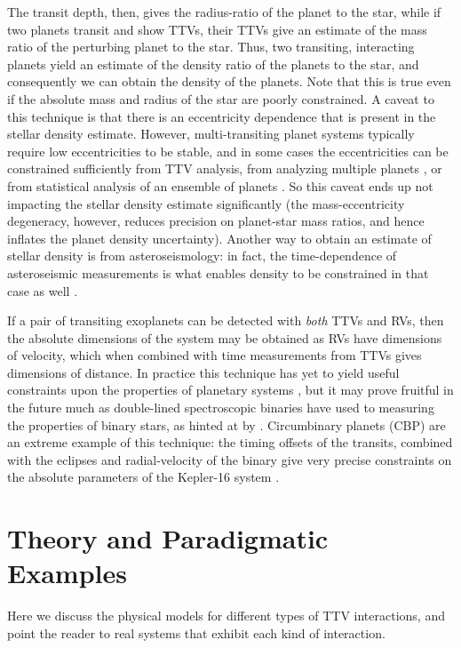 \documentclass[graybox,natbib,nosecnum]{svmult}
\begin{document}
The transit depth, then, gives the radius-ratio of the planet to the star, while if two planets
transit and show TTVs, their TTVs give an estimate of the mass ratio of the perturbing planet
to the star.  Thus, two transiting, interacting planets yield an estimate of the density ratio of
the planets to the star, and consequently we can obtain the density of the planets.
Note that this is true even if the absolute mass and radius of the star are poorly
constrained.  A caveat to this technique is that there is an eccentricity dependence that 
is present in the stellar density estimate.  However, multi-transiting planet systems typically require low eccentricities to be stable,
and in some cases the eccentricities can be constrained sufficiently from TTV analysis, from
analyzing multiple planets \citep{2014MNRAS.440.2164K}, or
from statistical analysis of an ensemble of planets \citep{Hadden2017}.  So this caveat ends up not impacting the stellar density 
estimate significantly (the mass-eccentricity degeneracy, however, reduces precision on planet-star mass ratios, and hence inflates the planet density uncertainty). 
Another way to obtain an estimate of stellar density is from asteroseismology:
in fact, the time-dependence of asteroseismic measurements is what enables density
to be constrained in that case as well \citep{1986ApJ...306L..37U}.

If a pair of transiting exoplanets can be detected with {\it both} TTVs and RVs, then the
absolute dimensions of the system may be obtained \citep{2005MNRAS.359..567A,
2013ApJ...762..112M} as RVs have dimensions of velocity, which 
when combined with time measurements from TTVs gives dimensions of distance.
In practice this technique has yet to yield useful constraints upon the properties
of planetary systems \citep{2015MNRAS.453.2644A}, but it may prove fruitful
in the future much as double-lined spectroscopic binaries have used to measuring 
the properties of binary stars, as hinted at by \cite{2016A&A...595L...5A}.  Circumbinary planets 
(CBP) are an extreme example of this technique: the timing offsets of the transits, combined with the eclipses
and radial-velocity of the binary give very precise constraints on the absolute parameters
of the Kepler-16 system \citep{2011Sci...333.1602D}.

\section{Theory and Paradigmatic Examples} 

Here we discuss the physical models for different types of TTV interactions, and point the reader to real systems that exhibit each kind of interaction. 
\end{document}
